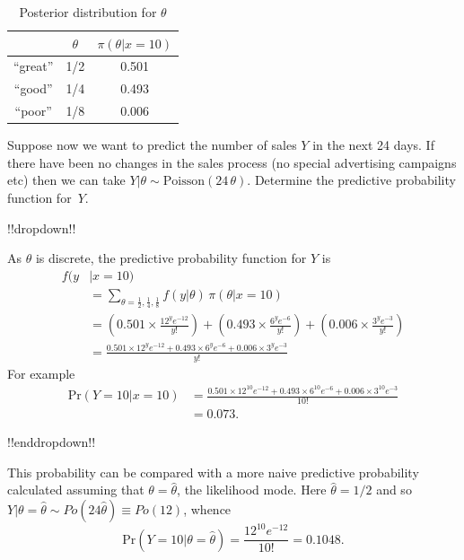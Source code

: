 {\begin{table}[ht]
\begin{tabular}{|c|c|c|}
\cline{2-3}
\multicolumn{1}{c|}{~}& $\theta$ & $\pi(\theta|x=10)$ \\
\hline
``great'' & 1/2 & 0.501 \\
``good''  & 1/4 & 0.493 \\
``poor''  & 1/8 & 0.006 \\
\hline
\end{tabular}
\caption{Posterior distribution for $\theta$}
\label{tab:predpost}

\end{table}

Suppose now we want to predict the number of sales $Y$ in the next 24
days. If there have been no changes in the sales process (no special
advertising campaigns etc) then we can take $Y|\theta\sim
\mathrm{Poisson}(24\,\theta)$. Determine the predictive probability function for~$Y$.



\clearpage

!!dropdown!!

As $\theta$ is discrete, the predictive probability
        function for $Y$ is
        \begin{align*}
        f(y&|x=10)\\
        &=\sum_{\theta=\frac{1}{2},\frac{1}{4},\frac{1}{8}} 
        f(y|\theta)\,\pi(\theta|x=10) \\
        &=\left(0.501\times\frac{12^ye^{-12}}{y!}\right) +
        \left(0.493\times\frac{6^ye^{-6}}{y!}\right)+
        \left(0.006\times\frac{3^ye^{-3}}{y!}\right) \\
        &=\frac{0.501\times 12^ye^{-12}+0.493\times 6^ye^{-6}+0.006\times 3^ye^{-3}}
        {y!}
        \end{align*}
        For example
        \begin{align*}
        \text{Pr}(Y=10|x=10)&=
        \frac{0.501\times 12^{10}e^{-12}+0.493\times 6^{10}e^{-6}+
        0.006\times 3^{10}e^{-3}}{10!}\\
        &=0.073.
        \end{align*}

!!enddropdown!!

This probability can be compared with a more naive predictive
probability calculated assuming that $\theta=\hat{\theta}$, the
likelihood mode. Here $\hat{\theta}=1/2$ and so $Y|\theta=\hat{\theta}\sim
Po(24\hat{\theta})\equiv Po(12)$, whence
\begin{equation*}
\text{Pr}(Y=10|\theta=\hat{\theta})=\frac{12^{10} e^{-12}}{10!}=0.1048.
\end{equation*}

}
